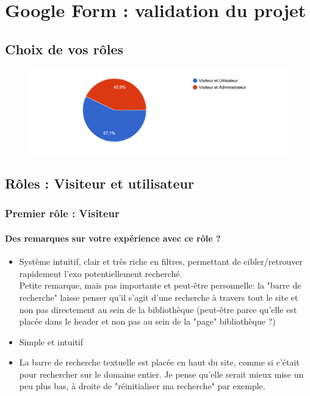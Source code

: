 \chapter{Google Form : validation du projet}
\label{annexe:googleForm}

\section{Choix de vos rôles}

\begin{figure}[H]
    \includegraphics[width=\textwidth,height=0.3\textheight,keepaspectratio]{images/googleForm/roles.png}
    \centering
\end{figure}

\section{Rôles : Visiteur et utilisateur}

\subsection{Premier rôle : Visiteur}

\subsubsection*{Des remarques sur votre expérience avec ce rôle ?}

\begin{itemize}
    \item Système intuitif, clair et très riche en filtres, permettant de cibler/retrouver rapidement l'exo potentiellement recherché.\\
    Petite remarque, mais pas importante et peut-être personnelle: la "barre de recherche" laisse penser qu'il s'agit d'une recherche à travers tout le site et non pas directement au sein de la bibliothèque (peut-être parce qu'elle est placée dans le header et non pas au sein de la "page" bibliothèque ?)
    \item Simple et intuitif
    \item La barre de recherche textuelle est placée en haut du site, comme si c'était pour rechercher sur le domaine entier. Je pense qu'elle serait mieux mise un peu plus bas, à droite de "réinitialiser ma recherche" par exemple.
\end{itemize}

